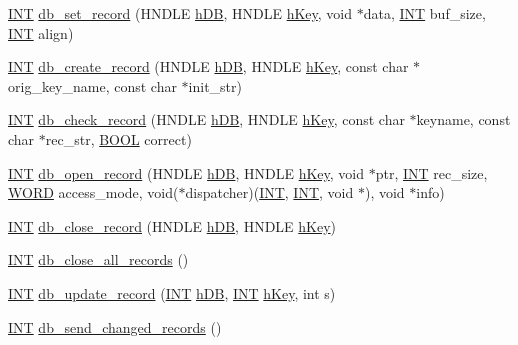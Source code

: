 \begin{DoxyCompactItemize}
\item 
\hyperlink{vppg_8h_a392e62da233ed3e2f7c3fd4f487a3896}{INT} \hyperlink{group__odbfunctionc_ga1e4bca66d45d069477c614bc2481d89f}{db\_\-set\_\-record} (HNDLE \hyperlink{mevb_8c_ab1f60c53f74e806a3b9f687af38d7421}{hDB}, HNDLE \hyperlink{mevb_8c_a8cd567d23219ba7fc83280cf20caf1c2}{hKey}, void $\ast$data, \hyperlink{vppg_8h_a392e62da233ed3e2f7c3fd4f487a3896}{INT} buf\_\-size, \hyperlink{vppg_8h_a392e62da233ed3e2f7c3fd4f487a3896}{INT} align)
\item 
\hyperlink{vppg_8h_a392e62da233ed3e2f7c3fd4f487a3896}{INT} \hyperlink{group__odbfunctionc_ga59b971e77416b2b463e2e63f1b05342b}{db\_\-create\_\-record} (HNDLE \hyperlink{mevb_8c_ab1f60c53f74e806a3b9f687af38d7421}{hDB}, HNDLE \hyperlink{mevb_8c_a8cd567d23219ba7fc83280cf20caf1c2}{hKey}, const char $\ast$orig\_\-key\_\-name, const char $\ast$init\_\-str)
\item 
\hyperlink{vppg_8h_a392e62da233ed3e2f7c3fd4f487a3896}{INT} \hyperlink{group__odbfunctionc_gad504df013bd9f61366ed48d6666985a1}{db\_\-check\_\-record} (HNDLE \hyperlink{mevb_8c_ab1f60c53f74e806a3b9f687af38d7421}{hDB}, HNDLE \hyperlink{mevb_8c_a8cd567d23219ba7fc83280cf20caf1c2}{hKey}, const char $\ast$keyname, const char $\ast$rec\_\-str, \hyperlink{vt2_8h_a239c7f0d40651c3e419c5b9651507d14}{BOOL} correct)
\item 
\hyperlink{vppg_8h_a392e62da233ed3e2f7c3fd4f487a3896}{INT} \hyperlink{group__odbfunctionc_ga852bc9fa8ee4d0884b328aeb0b0cfd63}{db\_\-open\_\-record} (HNDLE \hyperlink{mevb_8c_ab1f60c53f74e806a3b9f687af38d7421}{hDB}, HNDLE \hyperlink{mevb_8c_a8cd567d23219ba7fc83280cf20caf1c2}{hKey}, void $\ast$ptr, \hyperlink{vppg_8h_a392e62da233ed3e2f7c3fd4f487a3896}{INT} rec\_\-size, \hyperlink{vt2_8h_a2b0e863dadf920709ec53d9088ee7c91}{WORD} access\_\-mode, void($\ast$dispatcher)(\hyperlink{vppg_8h_a392e62da233ed3e2f7c3fd4f487a3896}{INT}, \hyperlink{vppg_8h_a392e62da233ed3e2f7c3fd4f487a3896}{INT}, void $\ast$), void $\ast$info)
\item 
\hyperlink{vppg_8h_a392e62da233ed3e2f7c3fd4f487a3896}{INT} \hyperlink{group__odbfunctionc_gaa621351e007f68f6298b8edf5bd652c4}{db\_\-close\_\-record} (HNDLE \hyperlink{mevb_8c_ab1f60c53f74e806a3b9f687af38d7421}{hDB}, HNDLE \hyperlink{mevb_8c_a8cd567d23219ba7fc83280cf20caf1c2}{hKey})
\item 
\hyperlink{vppg_8h_a392e62da233ed3e2f7c3fd4f487a3896}{INT} \hyperlink{group__odbfunctionc_ga8611a895b6ddf4cc6b25fed3c7473e3a}{db\_\-close\_\-all\_\-records} ()
\item 
\hyperlink{vppg_8h_a392e62da233ed3e2f7c3fd4f487a3896}{INT} \hyperlink{group__odbfunctionc_gae5f470f0c97794d8da1017f609276bc4}{db\_\-update\_\-record} (\hyperlink{vppg_8h_a392e62da233ed3e2f7c3fd4f487a3896}{INT} \hyperlink{mevb_8c_ab1f60c53f74e806a3b9f687af38d7421}{hDB}, \hyperlink{vppg_8h_a392e62da233ed3e2f7c3fd4f487a3896}{INT} \hyperlink{mevb_8c_a8cd567d23219ba7fc83280cf20caf1c2}{hKey}, int s)
\item 
\hyperlink{vppg_8h_a392e62da233ed3e2f7c3fd4f487a3896}{INT} \hyperlink{group__odbfunctionc_gae5ccb46009b64dbeff8dbc05be27664b}{db\_\-send\_\-changed\_\-records} ()
\end{DoxyCompactItemize}


